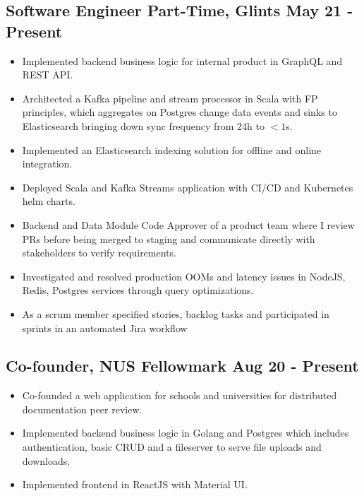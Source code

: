 \documentclass[9pts]{article}
\begin{document}
\subsection*{Software Engineer Part-Time, Glints \hfill May 21 - Present}
\begin{itemize}
    \item Implemented backend business logic for internal product in GraphQL and REST API.
    \item Architected a Kafka pipeline and stream processor in Scala with FP principles, which aggregates on Postgres change data events and sinks to Elasticsearch bringing down sync frequency from 24h to $<1$s.
    \item Implemented an Elasticsearch indexing solution for offline and online integration.
    \item Deployed Scala and Kafka Streams application with CI/CD and Kubernetes helm charts.
    \item Backend and Data Module Code Approver of a product team where I review PRs before being merged to staging and communicate directly with stakeholders to verify requirements.
    \item Investigated and resolved production OOMs and latency issues in NodeJS, Redis, Postgres services through query optimizations.
    \item As a scrum member specified stories, backlog tasks and participated in sprints in an automated Jira workflow
\end{itemize}

\subsection*{Co-founder, NUS Fellowmark \href{https://github.com/Fellowmark/fellowmark}{\faGithub} \href{https://youtu.be/LVmKodrE8e0}{\faYoutube} \hfill Aug 20 - Present}
\begin{itemize}
    \item Co-founded a web application for schools and universities for distributed documentation peer review.
    \item Implemented backend business logic in Golang and Postgres which includes authentication, basic CRUD and a fileserver to serve file uploads and downloads.
    \item Implemented frontend in ReactJS with Material UI.
\end{itemize}
\end{document}
